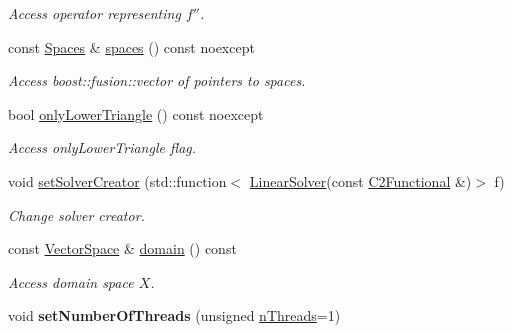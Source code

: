 \begin{DoxyCompactItemize}
\begin{DoxyCompactList}\small\item\em Access operator representing $f''$. \end{DoxyCompactList}\item 
\hypertarget{classSpacy_1_1Kaskade_1_1C2Functional_ac334455723ea59d001fef33e056b1ea7}{}const \hyperlink{classSpacy_1_1Kaskade_1_1C2Functional_afb866208161b4421f74aab07f50af065}{Spaces} \& \hyperlink{classSpacy_1_1Kaskade_1_1C2Functional_ac334455723ea59d001fef33e056b1ea7}{spaces} () const noexcept\label{classSpacy_1_1Kaskade_1_1C2Functional_ac334455723ea59d001fef33e056b1ea7}

\begin{DoxyCompactList}\small\item\em Access boost\+::fusion\+::vector of pointers to spaces. \end{DoxyCompactList}\item 
bool \hyperlink{classSpacy_1_1Kaskade_1_1C2Functional_a37152b2b1413e611d229a61318b86768}{only\+Lower\+Triangle} () const noexcept
\begin{DoxyCompactList}\small\item\em Access only\+Lower\+Triangle flag. \end{DoxyCompactList}\item 
void \hyperlink{classSpacy_1_1Kaskade_1_1C2Functional_a3b69bdfbeec77616425096b435573094}{set\+Solver\+Creator} (std\+::function$<$ \hyperlink{namespaceSpacy_a4cd614ddb41dd29e68a723dadd5602f2}{Linear\+Solver}(const \hyperlink{classSpacy_1_1Kaskade_1_1C2Functional}{C2\+Functional} \&)$>$ f)
\begin{DoxyCompactList}\small\item\em Change solver creator. \end{DoxyCompactList}\item 
\hypertarget{classSpacy_1_1FunctionalBase_a2d3397deb9fa1ad85ed04e37a03b3aa6}{}const \hyperlink{classSpacy_1_1VectorSpace}{Vector\+Space} \& \hyperlink{classSpacy_1_1FunctionalBase_a2d3397deb9fa1ad85ed04e37a03b3aa6}{domain} () const \label{classSpacy_1_1FunctionalBase_a2d3397deb9fa1ad85ed04e37a03b3aa6}

\begin{DoxyCompactList}\small\item\em Access domain space $X$. \end{DoxyCompactList}\item 
\hypertarget{classSpacy_1_1Mixin_1_1NumberOfThreads_ab0c2fca77cb0d613e3bb8ce5bda11fdc}{}void {\bfseries set\+Number\+Of\+Threads} (unsigned \hyperlink{classSpacy_1_1Mixin_1_1NumberOfThreads_a385963b95b5e1ddf422393146cc71ee1}{n\+Threads}=1)\label{classSpacy_1_1Mixin_1_1NumberOfThreads_ab0c2fca77cb0d613e3bb8ce5bda11fdc}


\end{DoxyCompactItemize}
